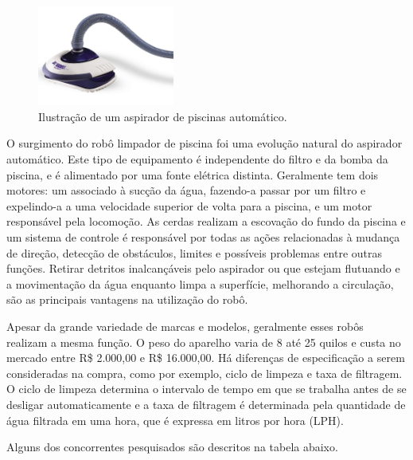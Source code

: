 \begin{figure}[h]
    \centering
    \includegraphics[width=0.4\textwidth]{figures/limpa_piscina_auto.png}
    \caption{Ilustração de um aspirador de piscinas automático.}
    \label{fig:schema-way-robot}
  \end{figure}

O surgimento do robô limpador de piscina foi uma evolução natural do aspirador 
automático. Este tipo de equipamento é independente do filtro e da bomba da 
piscina, e é alimentado por uma fonte elétrica distinta. Geralmente tem dois 
motores: um associado à sucção da água, fazendo-a passar por um filtro e 
expelindo-a a uma velocidade superior de volta para a piscina, e um motor 
responsável pela locomoção. As cerdas realizam a escovação do fundo da piscina 
e um sistema de controle é responsável por todas as ações relacionadas à 
mudança de direção, detecção de obstáculos, limites e possíveis problemas entre
outras funções. Retirar detritos inalcançáveis pelo aspirador ou que estejam flutuando
e a movimentação da água enquanto limpa a superfície, melhorando a circulação, são
as principais vantagens na utilização do robô.
 
Apesar da grande variedade de marcas e modelos, geralmente esses robôs realizam
a mesma função. O peso do aparelho varia de 8 até 25 quilos e  custa no mercado
entre  R\$ 2.000,00 e  R\$ 16.000,00. Há diferenças de especificação a serem 
consideradas na compra, como por exemplo, ciclo de limpeza e taxa de filtragem. 
O ciclo de limpeza determina o intervalo de tempo em que se trabalha antes de se desligar automaticamente e a taxa de filtragem é determinada pela quantidade de água filtrada em uma 
hora, que é expressa em litros por hora (LPH).

Alguns dos concorrentes pesquisados são descritos na tabela abaixo.

